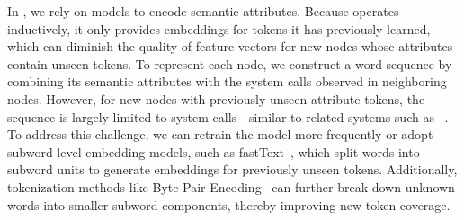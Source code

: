 
 In \Sys, we rely on \wordvec models to encode semantic attributes. Because \wordvec operates inductively, it only provides embeddings for tokens it has previously learned, which can diminish the quality of feature vectors for new nodes whose attributes contain unseen tokens. To represent each node, we construct a word sequence by combining its semantic attributes with the system calls observed in neighboring nodes. However, for new nodes with previously unseen attribute tokens, the sequence is largely limited to system calls—similar to related systems such as \threatrace~\cite{wang2022threatrace}. To address this challenge, we can retrain the \wordvec model more frequently or adopt subword-level embedding models, such as fastText~\cite{joulin2016bag}, which split words into subword units to generate embeddings for previously unseen tokens. Additionally, tokenization methods like Byte-Pair Encoding~\cite{araabi2022effective} can further break down unknown words into smaller subword components, thereby improving new token coverage.

